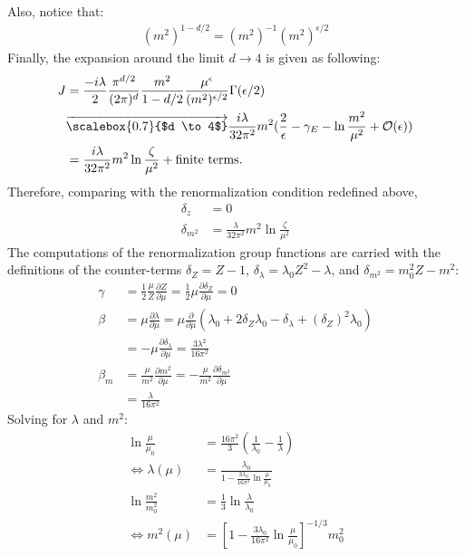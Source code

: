 \documentclass[fleqn]{article}
\begin{document}
Also, notice that:
\begin{align}
(m^{2})^{1-d/2} = (m^{2})^{-1}(m^{2})^{\epsilon/2}
\end{align}
Finally, the expansion around the limit $d \rightarrow 4$ is given as following:
\begin{align}
J &= \frac{-i\lambda}{2}\frac{\pi^{d/2}}{(2\pi)^{d}}\frac{m^{2}}{1-d/2}\frac{\mu^{\epsilon}}{(m^2)^{\epsilon/2}} \Gamma(\epsilon/2) \nonumber \\
&\overrightarrow {\scalebox{0.7}{$d \to 4$}} \frac{i\lambda}{32\pi^{2}}m^{2} (\frac{2}{\epsilon} - \gamma_{E} - \ln \frac{m^{2}}{\mu^{2}} + \mathcal{O}(\epsilon)) \nonumber \\
& = \frac{i\lambda}{32\pi^{2}}m^{2}\ln\frac{\zeta}{\mu^{2}} + \text{finite terms.}
\end{align}
Therefore, comparing with the renormalization condition redefined above, 
\begin{align}
\delta_{z} &= 0 \\
\delta_{m^{2}} &= \frac{\lambda}{32\pi^{2}} m^{2}\ln\frac{\zeta}{\mu^{2}}
\end{align}
The computations of the renormalization group functions are carried with the definitions of the counter-terms $\delta_Z = Z-1$, $\delta_{\lambda} = \lambda_{0}Z^{2} - \lambda$, and $\delta_{m^{2}} = m_{0}^{2}Z - m^{2}$:
\begin{align}
\gamma&= \frac{1}{2}\frac{\mu}{Z}\frac{\partial Z}{\partial \mu} = \frac{1}{2}\mu \frac{\partial \delta_{Z}}{\partial \mu} = 0\\
\beta & = \mu \frac{\partial \lambda}{\partial \mu} = \mu \frac{\partial}{\partial \mu}(\lambda_{0} + 2\delta_{Z}\lambda_{0} - \delta_{\lambda} + (\delta_{Z})^{2} \lambda_{0}) \nonumber \\
&= -\mu \frac{\partial \delta_{\lambda}}{\partial \mu} = \frac{3\lambda ^{2}}{16\pi^{2}}\\
\beta_{m}&= \frac{\mu}{m^{2}}\frac{\partial m^{2}}{\partial \mu} = -\frac{\mu}{m^{2}}\frac{\partial \delta_{m^{2}}}{\partial \mu} \nonumber \\
&= \frac{\lambda}{16\pi^{2}}
\end{align}
Solving for $\lambda$ and $m^{2}$:
\begin{align}
\ln \frac{\mu}{\mu_{0}} & = \frac{16\pi^{2}}{3}(\frac{1}{\lambda_{0}} - \frac{1}{\lambda}) \nonumber \\
\Leftrightarrow \lambda(\mu) &= \frac{\lambda_{0}}{1-\frac{3\lambda_{0}}{16\pi^{2}}\ln \frac{\mu}{\mu_{0}}}\\
\ln \frac{m^{2}}{m_{0}^{2}} & = \frac{1}{3}\ln \frac{\lambda}{\lambda_{0}} \nonumber \\
\Leftrightarrow m^{2}(\mu) &= [1-\frac{3\lambda_{0}}{16\pi^{2}} \ln \frac{\mu}{\mu_{0}}]^{-1/3} m_{0}^{2}
\end{align}
\end{document}
